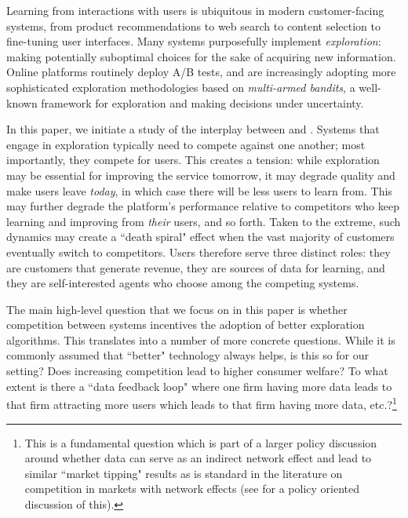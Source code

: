 
Learning from interactions with users is ubiquitous in modern customer-facing systems, from product recommendations to web search to content selection to fine-tuning user interfaces. Many systems purposefully implement \emph{exploration}: making potentially suboptimal choices for the sake of acquiring new information.
Online platforms routinely deploy A/B tests, and are increasingly adopting  more sophisticated exploration methodologies based on \emph{multi-armed bandits}, a well-known framework for exploration and making decisions under uncertainty. 



In this paper, we initiate a study of the interplay between \exploration and \competition. Systems that engage in exploration typically need to compete against one another; most importantly, they compete for users. This creates a tension:
while exploration may be essential for improving the service tomorrow, it may degrade quality and make users leave \emph{today}, in which case there will be less users to learn from. This may further degrade the platform's performance relative to competitors who keep learning and improving from \emph{their} users, and so forth. Taken to the extreme, such dynamics may create a ``death spiral" effect when the vast majority of customers eventually switch to competitors. Users therefore serve three distinct roles: they are customers that generate revenue, they are sources of data for learning, and they are self-interested agents who choose among the competing systems.


The main high-level question that we focus on in this paper is whether competition between systems incentives the adoption of better exploration algorithms. This translates into a number of more concrete questions. While it is commonly assumed that ``better" technology always helps, is this so for our setting? Does increasing competition lead to higher consumer welfare? To what extent is there a ``data feedback loop" where one firm having more data leads to that firm attracting more users which leads to that firm having more data, etc.?\footnote{This is a fundamental question which is part of a larger policy discussion around whether data can serve as an indirect network effect and lead to similar ``market tipping" results as is standard in the literature on competition in markets with network effects (see \cite{jullien2019economics} for a policy oriented discussion of this).}

